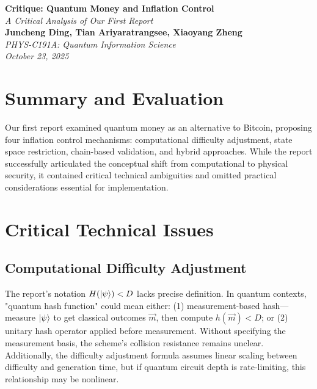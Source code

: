 \documentclass[a4paper,10.5pt,twoside]{article}
\begin{document}
\begin{center}
\LARGE
\textbf{Critique: Quantum Money and Inflation Control}\\[6pt]
\large
\textit{A Critical Analysis of Our First Report}\\[11pt]
\normalsize
\textbf{Juncheng Ding, Tian Ariyaratrangsee, Xiaoyang Zheng}\\[4pt]
\textit{PHYS-C191A: Quantum Information Science}\\[2pt]
\textit{October 23, 2025}\\[8pt]
\end{center}

\section{Summary and Evaluation}

Our first report examined quantum money as an alternative to Bitcoin, proposing four inflation control mechanisms: computational difficulty adjustment, state space restriction, chain-based validation, and hybrid approaches. While the report successfully articulated the conceptual shift from computational to physical security, it contained critical technical ambiguities and omitted practical considerations essential for implementation.

\section{Critical Technical Issues}

\subsection{Computational Difficulty Adjustment}

The report's notation $H(\ket{\psi}) < D$ lacks precise definition. In quantum contexts, "quantum hash function" could mean either: (1) measurement-based hash—measure $\ket{\psi}$ to get classical outcomes $\vec{m}$, then compute $h(\vec{m}) < D$; or (2) unitary hash operator applied before measurement. Without specifying the measurement basis, the scheme's collision resistance remains unclear. Additionally, the difficulty adjustment formula assumes linear scaling between difficulty and generation time, but if quantum circuit depth is rate-limiting, this relationship may be nonlinear.
\end{document}
